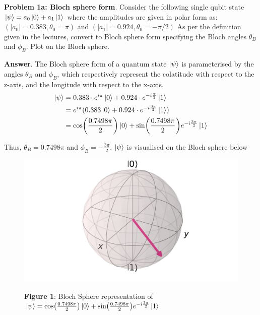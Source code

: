 \textbf{Problem 1a: Bloch sphere form}. Consider the following single qubit state $\ket{\psi} = a_0\ket{0} + a_1\ket{1}$ where the amplitudes are given in polar form as: $(|a_0| = 0.383, \theta_0 = \pi)$ and $(|a_1| = 0.924, \theta_0 = -\pi /2)$ 
As per the definition given in the lectures, convert to Bloch sphere form specifying the Bloch angles $\theta_B$ and $\phi_B$. Plot on the Bloch sphere.


\textbf{Answer}. The Bloch sphere form of a quantum state $\ket{\psi}$ is parameterised by the angles $\theta_B$ and $\phi_B$, which respectively represent the colatitude with respect to the z-axis, and the longitude with respect to the x-axis.
\begin{align*}
	\ket{\psi} &= 0.383 \cdot e^{i \pi} \ket{0} + 0.924 \cdot e^{-i \frac{\pi}{2}} \ket{1} \\
	&= e^{i \pi} (0.383 \ket{0} + 0.924 \cdot e^{-i \frac{3\pi}{2}} \ket{1}) \\
	&= \cos(\frac{0.7498 \pi}{2}) \ket{0} + \sin(\frac{0.7498 \pi}{2}) e^{-i \frac{3\pi}{2}} \ket{1}  
\end{align*}

Thus, $\theta_B = 0.7498\pi$ and $\phi_B = -\frac{3\pi}{2}$.
$\ket{\psi}$ is visualised on the Bloch sphere below

\begin{figure}[H]
	\captionlistentry{}
	\label{fig:laissez-faire}
	\begin{center}
	\includegraphics[width=0.85\linewidth]{graphics/q1a.pdf}
	\end{center}
    \textsf{\footnotesize{\textbf{Figure 1}: Bloch Sphere representation of $\ket{\psi} = \cos(\frac{0.7498 \pi}{2}) \ket{0} + \sin(\frac{0.7498 \pi}{2}) e^{-i \frac{3\pi}{2}} \ket{1}$}}
\end{figure}